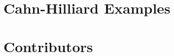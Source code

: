 \documentclass[tocAsPDFpart]{fipy}
\begin{document}


\chapter{Cahn-Hilliard Examples}




\backmatter


\fussy

% 



\printindex

\appendix 


\chapter*{Contributors}
\label{chap:Contributors}



\end{document}
